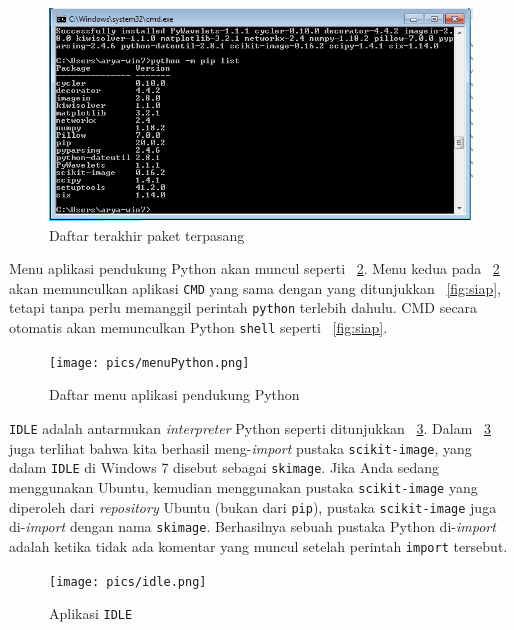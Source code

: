 \begin{figure}[h!]
  \begin{center}
    \includegraphics[scale=.5]{pics/pipList3.png}
    \caption{Daftar terakhir paket terpasang}
    \label{fig:daftarPaket2}
  \end{center}
\end{figure}

Menu aplikasi pendukung Python akan muncul seperti \figurename~\ref{fig:menu}. Menu kedua pada \figurename~\ref{fig:menu} akan memunculkan aplikasi \texttt{CMD} yang sama dengan yang ditunjukkan \figurename~\ref{fig:siap}, tetapi tanpa perlu memanggil perintah \texttt{python} terlebih dahulu. CMD secara otomatis akan memunculkan Python \texttt{shell} seperti \figurename~\ref{fig:siap}.

\begin{figure}[h!]
  \begin{center}
    \texttt{[image: pics/menuPython.png]}
    \caption{Daftar menu aplikasi pendukung Python}
    \label{fig:menu}
  \end{center}
\end{figure}

\texttt{IDLE} adalah antarmukan \textit{interpreter} Python seperti ditunjukkan \figurename~\ref{fig:idle}. Dalam \figurename~\ref{fig:idle} juga terlihat bahwa kita berhasil meng-\textit{import} pustaka \texttt{scikit-image}, yang dalam \texttt{IDLE} di Windows 7 disebut sebagai \texttt{skimage}. Jika Anda sedang menggunakan Ubuntu, kemudian menggunakan pustaka \texttt{scikit-image} yang diperoleh dari \textit{repository} Ubuntu (bukan dari \texttt{pip}), pustaka \texttt{scikit-image} juga di-\textit{import} dengan nama \texttt{skimage}. Berhasilnya sebuah pustaka Python di-\textit{import} adalah ketika tidak ada komentar yang muncul setelah perintah \texttt{import} tersebut.

\begin{figure}
  \begin{center}
    \texttt{[image: pics/idle.png]}
    \caption{Aplikasi \texttt{IDLE}}
    \label{fig:idle}
  \end{center}
\end{figure}

